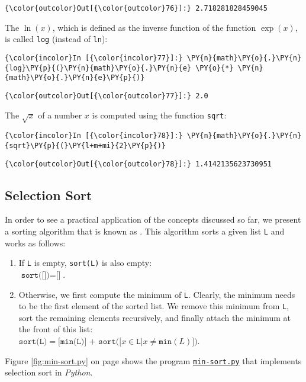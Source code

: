 \begin{Verbatim}[commandchars=\\\{\}]
{\color{outcolor}Out[{\color{outcolor}76}]:} 2.718281828459045
\end{Verbatim}
The  \(\ln(x)\), which is defined as the inverse function of the function \(\exp(x)\), is called \texttt{log} (instead of \texttt{ln}):
\begin{Verbatim}[commandchars=\\\{\}]
{\color{incolor}In [{\color{incolor}77}]:} \PY{n}{math}\PY{o}{.}\PY{n}{log}\PY{p}{(}\PY{n}{math}\PY{o}{.}\PY{n}{e} \PY{o}{*} \PY{n}{math}\PY{o}{.}\PY{n}{e}\PY{p}{)}
\end{Verbatim}

\begin{Verbatim}[commandchars=\\\{\}]
{\color{outcolor}Out[{\color{outcolor}77}]:} 2.0
\end{Verbatim}
The  \(\sqrt{x}\) of a number \(x\) is computed using the
function \texttt{sqrt}:
\begin{Verbatim}[commandchars=\\\{\}]
{\color{incolor}In [{\color{incolor}78}]:} \PY{n}{math}\PY{o}{.}\PY{n}{sqrt}\PY{p}{(}\PY{l+m+mi}{2}\PY{p}{)}
\end{Verbatim}

\begin{Verbatim}[commandchars=\\\{\}]
{\color{outcolor}Out[{\color{outcolor}78}]:} 1.4142135623730951
\end{Verbatim}


\subsection{Selection Sort}
In order to see a practical application of the concepts discussed so far, we present a sorting
algorithm that is known as \href{https://en.wikipedia.org/wiki/Selection_sort}{}.
This algorithm sorts a given list \texttt{L} and works as follows:
\begin{enumerate}
\item If \texttt{L} is empty, \texttt{sort(L)} is also empty:
      \\[0.2cm]
      \hspace*{1.3cm}
      $\texttt{sort([])} = \texttt{[]}$.
\item Otherwise, we first compute the minimum of \texttt{L}.  Clearly, the minimum needs to be the
      first element of the sorted list.  We remove this minimum from \texttt{L}, sort the remaining
      elements recursively, and finally attach the minimum at the front of this list:
      \\[0.2cm]
      \hspace*{1.3cm}
      $\texttt{sort(L)} = \texttt{[min(L)] + sort([}x \in \texttt{L} \texttt{|} x \not= \texttt{min}(L)\texttt{])}$.
\end{enumerate}
Figure \ref{fig:min-sort.py} on page \pageref{fig:min-sort.py} shows the program
\href{https://github.com/karlstroetmann/Logic/blob/master/Python/min-sort.py}{\texttt{min-sort.py}}
that implements selection sort  in \textsl{Python}. 

